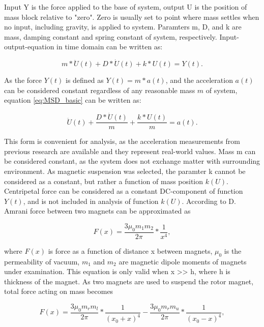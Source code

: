 Input Y is the force applied to the base of system, output U is the position of mass block relative to "zero". Zero is usually set to point where mass settles when no input, including gravity, is applied to system. Paramters m, D, and k are mass, damping constant and spring constant of system, respectively. Input-output-equation in time domain can be written as: 

\begin{equation}\label{eq:MSD_basic}
  m * \ddot{U}(t) + D * \dot{U}(t) + k * U(t) = Y(t). 
\end{equation}

As the force $ Y(t) $ is defined as $ Y(t) = m*a(t) $, and the acceleration $ a(t)$ can be considered constant regardless of any reasonable mass $ m $ of system, equation \eqref{eq:MSD_basic} can be written as:

\begin{equation}\label{eq:MSD_acceleration}
 \ddot{U}(t) + \frac{D * \dot{U}(t)}{m} + \frac{k * U(t)}{m} = a(t). 
\end{equation}

This form is convenient for analysis, as the acceleration measurements from previous research are available and they represent real-world values. Mass m can be considered constant, as the system does not exchange matter with surrounding environment. As magnetic suspension was selected, the paramter k cannot be considered as a constant, but rather a function of mass position $k(U)$. Centripetal force can be considered as a constant DC-component of function $Y(t)$, and is not included in analysis of function $k(U)$. According to D. Amrani \cite{Amrani2015} force between two magnets can be approximated as

\begin{equation}\label{eq:magnetic_force}
  F(x) = \frac{3 \mu_0 m_1 m_2}{2 \pi} * \frac{1}{x^4},
\end{equation}

where $F(x)$ is force as a function of distance x between magnets, $\mu_0$ is the permeability of vacuum, $ m_1 $ and $ m_2 $ are magnetic dipole moments of magnets under examination. This equation is only valid when x >> h, where h is thickness of the magnet. As two magnets are used to suspend the rotor magnet, total force acting on mass becomes 

\begin{equation}\label{eq:magnetic_force_middle}
  F(x) = \frac{3 \mu_0 m_r m_l}{2 \pi} * \frac{1}{(x_0+x)^4} - \frac{3 \mu_0 m_r m_u}{2 \pi} * \frac{1}{(x_0-x)^4},
\end{equation}

